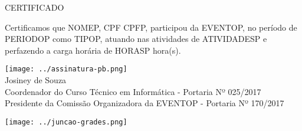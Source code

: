 \documentclass{abnt}
\begin{document}
\BgThispage
\color{CONF_COR}
\bf
\begin{center}
    \Huge{CERTIFICADO}
\end{center}

Certificamos que NOMEP, CPF CPFP, participou da EVENTOP, no período de
PERIODOP como TIPOP, atuando nas atividades de ATIVIDADESP e perfazendo a
carga horária de HORASP hora(s).


\begin{center}
\texttt{[image: ../assinatura-pb.png]}\\
Josiney de Souza\\
Coordenador do Curso Técnico em Informática - Portaria Nº 025/2017\\
Presidente da Comissão Organizadora da EVENTOP - Portaria Nº 170/2017
\end{center}

\newpage
{}

\texttt{[image: ../juncao-grades.png]}
\end{document}
